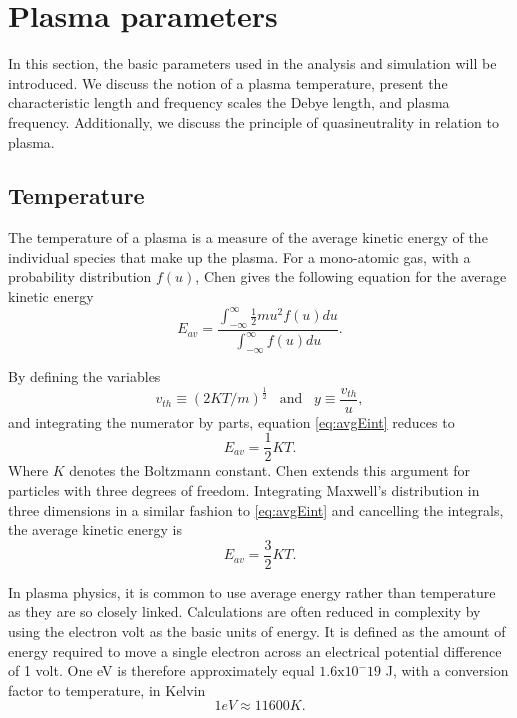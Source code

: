 \section{Plasma parameters}\label{subsec:pParam}
In this section, the basic parameters used in the analysis and simulation will be introduced. We discuss the notion of a plasma temperature, present the characteristic length and frequency scales the Debye length, and plasma frequency. Additionally, we discuss the principle of quasineutrality in relation to plasma. 

\subsection{Temperature}\label{subsec:temperature}
The temperature of a plasma is a measure of the average kinetic energy of the individual species that make up the plasma. For a mono-atomic gas, with a probability distribution $f(u)$, Chen \parencite[Section 1.3]{Chen2018} gives the following equation for the average kinetic energy
\begin{equation}\label{eq:avgEint}
    E_{av} = \frac{\int^\infty_{-\infty} \frac{1}{2} m u^2 f(u) du}{\int^\infty_{-\infty} f(u) du}.
\end{equation}

By defining the variables 
\begin{equation*}
    v_{th} \equiv (2 K T / m)^{\frac{1}{2}} \hspace{10pt} \text{and} \hspace{10pt} y \equiv \frac{v_{th}}{u},
\end{equation*}
and integrating the numerator by parts, equation \eqref{eq:avgEint} reduces to
\begin{equation}\label{eq:avgE1D}
    E_{av} = \frac{1}{2} K T.
\end{equation}
Where $K$ denotes the Boltzmann constant. Chen extends this argument for particles with three degrees of freedom. Integrating Maxwell's distribution in three dimensions in a similar fashion to \eqref{eq:avgEint} and cancelling the integrals, the average kinetic energy is
\begin{equation}\label{eq:avgE3D}
    E_{av} = \frac{3}{2} K T.
\end{equation}

In plasma physics, it is common to use average energy rather than temperature as they are so closely linked. Calculations are often reduced in complexity by using the electron volt as the basic units of energy. It is defined as the amount of energy required to move a single electron across an electrical potential difference of 1 volt. One eV is therefore approximately equal $1.6 \text{x} 10^-19$ J, with a conversion factor to temperature, in Kelvin
\begin{equation*}
    1 eV \approx 11600 K.
\end{equation*}

